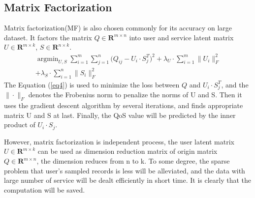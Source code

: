 \documentclass[conference]{IEEEtran}
\begin{document}
\subsection{Matrix Factorization}
Matrix factorization(MF) is also chosen commonly for its accuracy on large dataset. It factors the matrix $Q\in \textbf{R}^{m \times n} $ into user and service latent matrix $U\in \textbf{R}^{m \times k}$, $S \in \textbf{R}^{n \times k}$. 
\begin{equation}
\begin{aligned}
\mathop{argmin}_{U,S} \sum_{i=1}^{m}{\sum_{j=1}^{n}{
(Q_{ij}-U_{i} \cdot S_{j}^{T}})^{2}
}
 + \lambda_{U} \cdot \sum_{i=1}^{m}\|U_{i}\|_{F}^{2} \\
+ \lambda_{S} \cdot \sum_{i=1}^{n}\|S_{i}\|_{F}^{2}
\label{eq4}
\end{aligned}
\end{equation}
The Equation (\ref{eq4}) is used to minimize the loss between $Q$ and 
$U_{i} \cdot S_{j}^{T}$, and the $\| \cdot \|_{F}$ denotes the Frobenius norm\cite{chen_user_2016} to penalize the norms of U and S. Then it uses the gradient descent algorithm by several iterations, and finds appropriate matrix U and S at last. Finally, the QoS value will be predicted by the inner product of $U_{i} \cdot S_{j}$. 
\par However, matrix factorization is independent process, the user latent matrix $U \in \textbf{R}^{m \times k}$ can be used as dimension reduction matrix of origin matrix $Q \in \textbf{R}^{m \times n}$, the dimension reduces from n to k. To some degree, the sparse problem that user's sampled records is less will be alleviated, and the data with large number of service will be dealt efficiently in short time. It is clearly that the computation will be saved.
\end{document}
